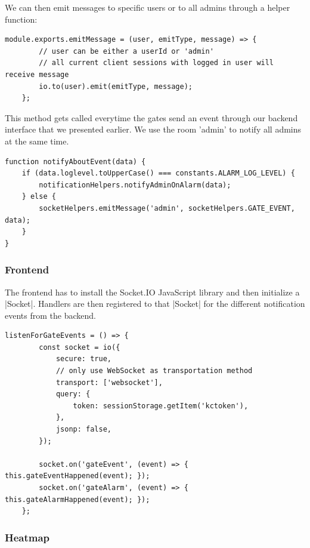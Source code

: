We can then emit messages to specific users or to all admins through a helper function:
\begin{lstlisting}[label=emitMessage]
module.exports.emitMessage = (user, emitType, message) => {
        // user can be either a userId or 'admin'
        // all current client sessions with logged in user will receive message
        io.to(user).emit(emitType, message);
    };
\end{lstlisting}

This method gets called everytime the gates send an event through our backend interface that we presented earlier. We use the room 'admin' to notify all admins at the same time.

\begin{lstlisting}[label=socketIOBackendNotification]
function notifyAboutEvent(data) {
    if (data.loglevel.toUpperCase() === constants.ALARM_LOG_LEVEL) {
        notificationHelpers.notifyAdminOnAlarm(data);
    } else {
        socketHelpers.emitMessage('admin', socketHelpers.GATE_EVENT, data);
    }
}
\end{lstlisting}

\subsubsection{Frontend}
\label{Frontend}

The frontend has to install the Socket.IO JavaScript library and then initialize a |Socket|\cite{socketio:socket}. Handlers are then registered to that |Socket| for the different notification events from the backend.

\begin{lstlisting}[label=socketIOClientSide]
listenForGateEvents = () => {
        const socket = io({
            secure: true,
            // only use WebSocket as transportation method
            transport: ['websocket'],
            query: {
                token: sessionStorage.getItem('kctoken'),
            },
            jsonp: false,
        });

        socket.on('gateEvent', (event) => { this.gateEventHappened(event); });
        socket.on('gateAlarm', (event) => { this.gateAlarmHappened(event); });
    };
\end{lstlisting}


\subsubsection{Heatmap}


